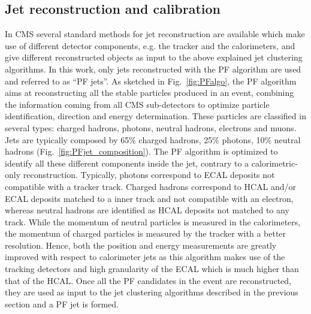 \subsection{Jet reconstruction and calibration}\label{subsec:jetsreco} %

In CMS several standard methods for jet reconstruction are available which make use of different detector components, e.g. the tracker and the calorimeters, and give different reconstructed objects as input to the above explained jet clustering algorithms. In this work, only jets reconstructed with the PF algorithm are used and referred to as ``PF jets''.
As sketched in Fig.~\ref{fig:PFalgo}, the PF algorithm aims at reconstructing all the stable particles produced in an event, combining the information coming from all CMS sub-detectors to optimize particle identification, direction and energy determination. These particles are classified in several types: charged hadrons, photons, neutral hadrons, electrons and muons. Jets are typically composed by 65\% charged hadrons, 25\% photons, 10\% neutral hadrons (Fig.~\ref{fig:PFjet_composition}). The PF algorithm is optimized to identify all these different components inside the jet, contrary to a calorimetric-only reconstruction. Typically, photons correspond to ECAL deposits not compatible with a tracker track. Charged hadrons correspond to HCAL and/or ECAL deposits matched to a inner track and not compatible with an electron, whereas neutral hadrons are identified as HCAL deposits not matched to any track.
While the momentum of neutral particles is measured in the calorimeters, the momentum of charged particles is measured by the tracker with a better resolution. Hence, both the position and energy measurements are greatly improved with respect to calorimeter jets as this algorithm makes use of the tracking detectors and high granularity of the ECAL which is much higher than that of the HCAL.
Once all the PF candidates in the event are reconstructed, they are used as input to the jet clustering algorithms described in the previous section and a PF jet is formed.

